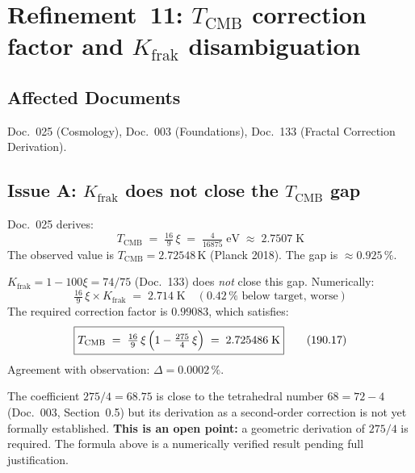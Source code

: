 \section{\texorpdfstring{Refinement~11: $T_\text{CMB}$ correction factor and $K_\text{frak}$ disambiguation}{Refinement 11: T\_CMB correction factor and K\_frak disambiguation}}

\subsection*{Affected Documents}

Doc.~025 (Cosmology), Doc.~003 (Foundations), Doc.~133 (Fractal Correction Derivation).

\subsection*{Issue A: $K_\text{frak}$ does not close the $T_\text{CMB}$ gap}

Doc.~025 derives:
\begin{equation}
  T_\text{CMB} \;=\; \tfrac{16}{9}\,\xi \;=\; \tfrac{4}{16875}\;\text{eV}
  \;\approx\; 2.7507\;\text{K}
  \tag{190.15}
\end{equation}
The observed value is $T_\text{CMB} = 2.72548\,\text{K}$ (Planck 2018).
The gap is $\approx 0.925\,\%$.

$K_\text{frak} = 1 - 100\xi = 74/75$ (Doc.~133) does \emph{not} close this
gap. Numerically:
\begin{equation}
  \tfrac{16}{9}\,\xi \times K_\text{frak} \;=\; 2.714\;\text{K}
  \quad (0.42\,\% \text{ below target, worse})
  \tag{190.16}
\end{equation}
The required correction factor is $0.99083$, which satisfies:
\begin{equation}
  \boxed{
    T_\text{CMB} \;=\; \tfrac{16}{9}\,\xi\,\Bigl(1 - \tfrac{275}{4}\,\xi\Bigr)
    \;=\; 2.725486\;\text{K}
  }
  \tag{190.17}
\end{equation}
Agreement with observation: $\Delta = 0.0002\,\%$.

The coefficient $275/4 = 68.75$ is close to the tetrahedral number $68 = 72 - 4$
(Doc.~003, Section~0.5) but its derivation as a second-order correction is not
yet formally established. \textbf{This is an open point:} a geometric derivation
of $275/4$ is required. The formula above is a numerically verified
result pending full justification.

